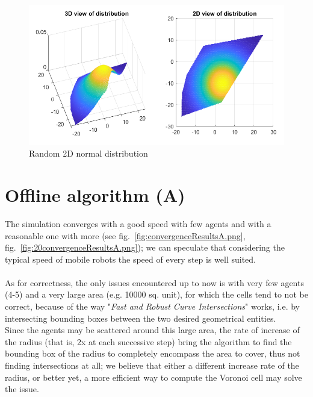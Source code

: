 \documentclass[a4paper,11pt,oneside]{book}
\begin{document}
	\begin{figure}	
		\centering	
		\includegraphics[scale=0.7]{figs/gaussianDistrib.png}
		\caption{Random 2D normal distribution}\label{fig:gaussianDistrib.png}	
	\end{figure}
	
	\section{Offline algorithm (A)}
	
	The simulation converges with a good speed with few agents and with a reasonable one with more (see fig.~\ref{fig:convergenceResultsA.png}, fig.~\ref{fig:20convergenceResultsA.png}); we can speculate that considering the typical speed of mobile robots the speed of every step is well suited.\\\\
	As for correctness, the only issues encountered up to now is with very few agents (4-5) and a very large area (e.g. 10000 sq. unit), for which the cells tend to not be correct, because of the way "\emph{Fast and Robust Curve Intersections}" works, i.e. by intersecting bounding boxes between the two desired geometrical entities.\\
	Since the agents may be scattered around this large area, the rate of increase of the radius (that is, 2x at each successive step) bring the algorithm to find the bounding box of the radius to completely encompass the area to cover, thus not finding intersections at all; we believe that either a different increase rate of the radius, or better yet, a more efficient way to compute the Voronoi cell may solve the issue.
	
\end{document}
